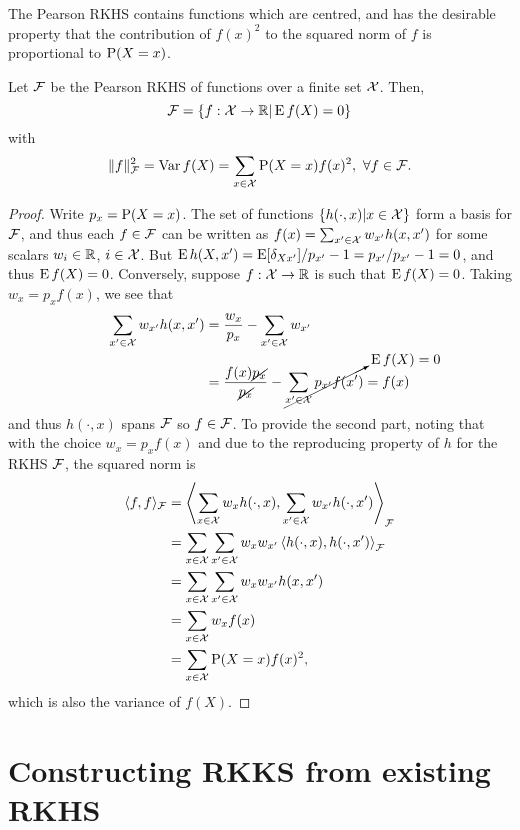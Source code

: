 \documentclass[a4paper,showframe,11pt,draft]{report}
\begin{document}
The Pearson RKHS contains functions which are centred, and has the desirable property that the contribution of $f(x)^2$ to the squared norm of $f$ is proportional to $\operatorname{P}(X=x)$.

\begin{claim}
  Let ${\mathcal F}$ be the Pearson RKHS of functions over a finite set ${\mathcal X}$.
  Then,
  \[
    {\mathcal F} = \{f:{\mathcal X}\to\mathbb{R} | \operatorname{E} f(X) = 0 \}
  \]
  with
  \[
    \lVert f\rVert_{\mathcal F}^2 = \operatorname{Var} f(X) = \sum_{x\in{\mathcal X}} \operatorname{P}(X=x)f(x)^2, \ \forall f \in {\mathcal F}.
  \]
\end{claim}

\begin{proof}
  Write $p_x = \operatorname{P}(X=x)$.
  The set of functions $\{h(\cdot,x) | x \in {\mathcal X}\}$ form a basis for ${\mathcal F}$, and thus each $f \in {\mathcal F}$ can be written as $f(x) = \sum_{x'\in{\mathcal X}} w_{x'}h(x,x')$ for some scalars $w_i\in\mathbb{R}$, $i\in{\mathcal X}$.
  But $\operatorname{E} h(X,x') = \operatorname{E} [\delta_{Xx'}] / p_{x'} - 1 = p_{x'} / p_{x'} - 1 = 0$, and thus $\operatorname{E} f(X) = 0$.
  Conversely, suppose $f:{\mathcal X}\to\mathbb{R}$ is such that $\operatorname{E} f(X) = 0$.
  Taking $w_x = p_xf(x)$, we see that
  \begin{align*}
    \sum_{x'\in{\mathcal X}} w_{x'}h(x,x') 
    &= \frac{w_x}{p_x} - \sum_{x'\in{\mathcal X}} w_{x'} \\
    &= \frac{f(x)\cancel{p_x}}{\cancel{p_x}} - \cancelto{\operatorname{E} f(X) = 0}{\sum_{x'\in{\mathcal X}} p_{x'}f(x')} = f(x)
  \end{align*}
  and thus $h(\cdot,x)$ spans ${\mathcal F}$ so $f\in{\mathcal F}$.
  To provide the second part, noting that with the choice $w_x = p_xf(x)$ and due to the reproducing property of $h$ for the RKHS ${\mathcal F}$, the squared norm is 
  \begin{align*}
    \langle f,f\rangle_{\mathcal F} 
    &= \left\langle \sum_{x\in{\mathcal X}} w_{x}h(\cdot,x), \sum_{x'\in{\mathcal X}} w_{x'}h(\cdot,x') \right\rangle_{\mathcal F} \\
    &= \sum_{x\in{\mathcal X}} \sum_{x'\in{\mathcal X}} w_{x} w_{x'} \left\langle h(\cdot,x), h(\cdot,x') \right\rangle_{\mathcal F} \\
    &= \sum_{x\in{\mathcal X}} \sum_{x'\in{\mathcal X}} w_{x} w_{x'} h(x,x')  \\
    &= \sum_{x\in{\mathcal X}} w_{x} f(x) \\
    &= \sum_{x\in{\mathcal X}} \operatorname{P}(X=x) f(x)^2,
  \end{align*}
  which is also the variance of $f(X)$.
\end{proof}

\section{Constructing RKKS from existing RKHS}
\end{document}
